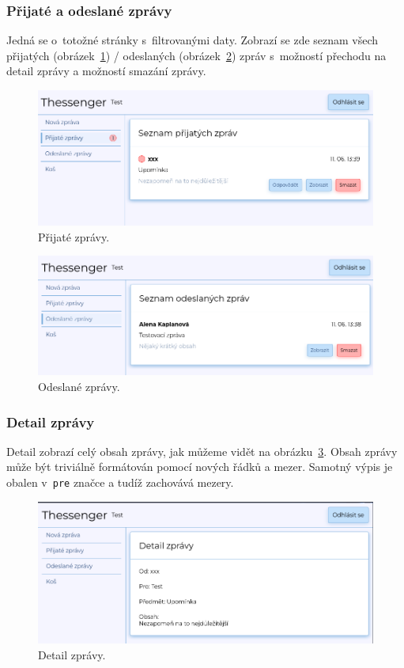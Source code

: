 \documentclass[
  master,
  program=ainf,
  printversion,
  tables=false,
  sourcecodes,
  glossaries,
  index
]{kidiplom}
\begin{document}
\subsubsection{Přijaté a odeslané zprávy}
Jedná se o~totožné stránky s~filtrovanými daty. Zobrazí se zde seznam všech
přijatých (obrázek~\ref{fig:inobx}) / odeslaných (obrázek~\ref{fig:outbox}) zpráv s~možností přechodu na detail 
zprávy a možností smazání zprávy.

\begin{figure}[H]
  \centering
  \includegraphics[width=\textwidth]{graphics/thessenger_inbox.png}
  \caption{Přijaté zprávy.}
  \label{fig:inobx}
\end{figure}

\begin{figure}[H]
  \centering
  \includegraphics[width=\textwidth]{graphics/thessenger_outbox.png}
  \caption{Odeslané zprávy.}
  \label{fig:outbox}
\end{figure}

\subsubsection{Detail zprávy}
Detail zobrazí celý obsah zprávy, jak můžeme vidět na obrázku~\ref{fig:message_detail}. Obsah
zprávy může být triviálně formátován pomocí nových řádků a mezer. Samotný výpis je obalen v~{\tt pre}
značce a tudíž zachovává mezery.

\begin{figure}[H]
  \centering
  \includegraphics[width=\textwidth]{graphics/thessenger_message_detail.png}
  \caption{Detail zprávy.}
  \label{fig:message_detail}
\end{figure}
\end{document}
